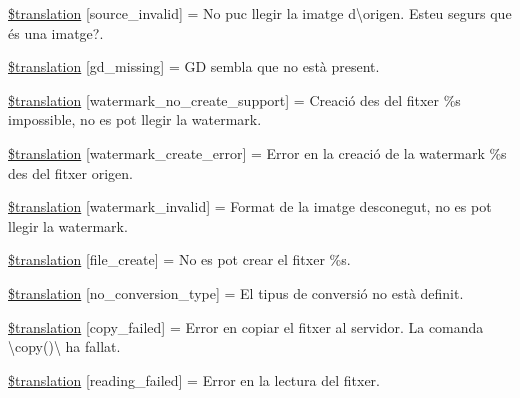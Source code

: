 \begin{DoxyCompactItemize}
\item 
\hyperlink{class_8upload_8ca___c_a_8php_a6ab0a660b457eaf2d3434b225449fdd6}{\$translation} \mbox{[}\textquotesingle{}source\+\_\+invalid\textquotesingle{}\mbox{]} = \textquotesingle{}No puc llegir la imatge d\textbackslash{}\textquotesingle{}origen. Esteu segurs que és una imatge?.\textquotesingle{}
\item 
\hyperlink{class_8upload_8ca___c_a_8php_a7f3dfcc0db4bbc0f2e7210c439798e56}{\$translation} \mbox{[}\textquotesingle{}gd\+\_\+missing\textquotesingle{}\mbox{]} = \textquotesingle{}G\+D sembla que no està present.\textquotesingle{}
\item 
\hyperlink{class_8upload_8ca___c_a_8php_a82d5853430ab72dc1f9799ec36144cc6}{\$translation} \mbox{[}\textquotesingle{}watermark\+\_\+no\+\_\+create\+\_\+support\textquotesingle{}\mbox{]} = \textquotesingle{}Creació des del fitxer \%s impossible, no es pot llegir la watermark.\textquotesingle{}
\item 
\hyperlink{class_8upload_8ca___c_a_8php_aabca0b65dadbc6184415c16375f284ca}{\$translation} \mbox{[}\textquotesingle{}watermark\+\_\+create\+\_\+error\textquotesingle{}\mbox{]} = \textquotesingle{}Error en la creació de la watermark \%s des del fitxer origen.\textquotesingle{}
\item 
\hyperlink{class_8upload_8ca___c_a_8php_ac336e7a5701e47ba4a05e9e498a3cc44}{\$translation} \mbox{[}\textquotesingle{}watermark\+\_\+invalid\textquotesingle{}\mbox{]} = \textquotesingle{}Format de la imatge desconegut, no es pot llegir la watermark.\textquotesingle{}
\item 
\hyperlink{class_8upload_8ca___c_a_8php_a1ecb4673e4fb69e06b3f20b65cecf30a}{\$translation} \mbox{[}\textquotesingle{}file\+\_\+create\textquotesingle{}\mbox{]} = \textquotesingle{}No es pot crear el fitxer \%s.\textquotesingle{}
\item 
\hyperlink{class_8upload_8ca___c_a_8php_a4712d7ec28e9a7f17eb3338af2358363}{\$translation} \mbox{[}\textquotesingle{}no\+\_\+conversion\+\_\+type\textquotesingle{}\mbox{]} = \textquotesingle{}El tipus de conversió no està definit.\textquotesingle{}
\item 
\hyperlink{class_8upload_8ca___c_a_8php_a783c9358bcf54a054545b50098bc679b}{\$translation} \mbox{[}\textquotesingle{}copy\+\_\+failed\textquotesingle{}\mbox{]} = \textquotesingle{}Error en copiar el fitxer al servidor. La comanda \textbackslash{}\textquotesingle{}copy()\textbackslash{}\textquotesingle{} ha fallat.\textquotesingle{}
\item 
\hyperlink{class_8upload_8ca___c_a_8php_a01bea14c9fd5f353f62db44beabfcd42}{\$translation} \mbox{[}\textquotesingle{}reading\+\_\+failed\textquotesingle{}\mbox{]} = \textquotesingle{}Error en la lectura del fitxer.\textquotesingle{}
\end{DoxyCompactItemize}


